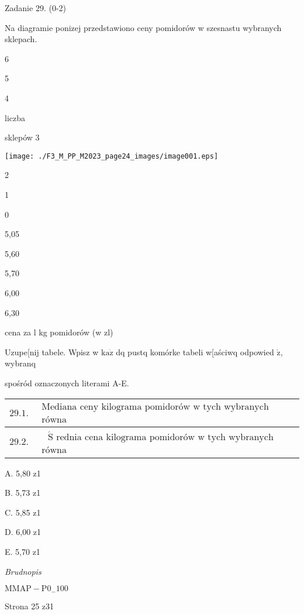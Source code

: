 \documentclass[a4paper,12pt]{article}
\begin{document}
Zadanie 29. (0-2)

Na diagramie ponizej przedstawiono ceny pomidorów w szesnastu wybranych sklepach.

6

5

4

liczba

sklepów 3
\begin{center}
\texttt{[image: ./F3\_M\_PP\_M2023\_page24\_images/image001.eps]}
\end{center}
2

1

0

5,05

5,60

5,70

6,00

6,30

cena za l kg pomidorów (w zl)

Uzupe[nij tabele. Wpisz w $\mathrm{k}\mathrm{a}\dot{\mathrm{z}}$ dq pustq komórke tabeli w[aściwq odpowied $\acute{\mathrm{z}}$, wybranq

spośród oznaczonych literami A-E.
\begin{center}
\begin{tabular}{|l|l|l|}
\hline
\multicolumn{1}{|l|}{$29.1.$}&	\multicolumn{1}{|l|}{$\begin{array}{l}\mbox{Mediana ceny kilograma pomidorów w tych wybranych sklepach jest}	\\	\mbox{równa}	\end{array}$}&	\multicolumn{1}{|l|}{}	\\
\hline
\multicolumn{1}{|l|}{ $29.2.$}&	\multicolumn{1}{|l|}{$\begin{array}{l}\mbox{ $\acute{\mathrm{S}}$ rednia cena kilograma pomidorów w tych wybranych sklepach jest}	\\	\mbox{równa}	\end{array}$}&	\multicolumn{1}{|l|}{}	\\
\hline
\end{tabular}

\end{center}
A. 5,80 z1

B. 5,73 z1

C. 5,85 z1

D. 6,00 z1

E. 5,70 z1

{\it Brudnopis}

$\mathrm{M}\mathrm{M}\mathrm{A}\mathrm{P}-\mathrm{P}0_{-}100$

Strona 25 z31
\end{document}
